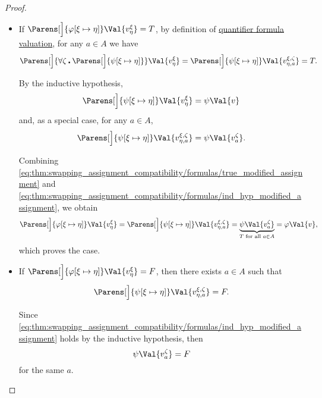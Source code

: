 \begin{proof}
\begin{itemize}
\begin{itemize}
      \begin{itemize}
        \item If \( \Parens[\Big]{\varphi[\xi \mapsto \eta]}\Val{v_\eta^\xi} = T \), by definition of \hyperref[def:first_order_valuation/formula_valuation]{quantifier formula valuation}, for any \( a \in A \) we have
        \begin{equation}\label{eq:thm:swapping_assignment_compatibility/formulas/true_modified_assignment}
          \Parens[\Big]{\forall \zeta \centerdot \Parens[\Big]{ \psi[\xi \mapsto \eta] }}\Val{v_\eta^\xi}
          =
          \Parens[\Big]{\psi[\xi \mapsto \eta]}\Val{v_{\eta,a}^{\xi,\zeta}}
          =
          T.
        \end{equation}

        By the inductive hypothesis,
        \begin{equation*}
          \Parens[\Big]{ \psi[\xi \mapsto \eta] }\Val{v_\eta^\xi} = \psi\Val{v}
        \end{equation*}
        and, as a special case, for any \( a \in A \),
        \begin{equation}\label{eq:thm:swapping_assignment_compatibility/formulas/ind_hyp_modified_assignment}
          \Parens[\Big]{ \psi[\xi \mapsto \eta] }\Val{v_{\eta,a}^{\xi,\zeta}} = \psi\Val{v_a^\zeta}.
        \end{equation}

        Combining \eqref{eq:thm:swapping_assignment_compatibility/formulas/true_modified_assignment} and \eqref{eq:thm:swapping_assignment_compatibility/formulas/ind_hyp_modified_assignment}, we obtain
        \begin{equation*}
          \Parens[\Big]{ \varphi[\xi \mapsto \eta] }\Val{v_\eta^\xi}
          =
          \Parens[\Big]{ \psi[\xi \mapsto \eta] }\Val{v_{\eta,a}^{\xi,\zeta}}
          =
          \underbrace{\psi\Val{v_a^\zeta}}_{T \T{for all} a \in A}
          =
          \varphi\Val{v},
        \end{equation*}
        which proves the case.

        \item If \( \Parens[\Big]{\varphi[\xi \mapsto \eta]}\Val{v_\eta^\xi} = F \), then there exists \( a \in A \) such that
        \begin{equation*}
          \Parens[\Big]{\psi[\xi \mapsto \eta]}\Val{v_{\eta,a}^{\xi,\zeta}} = F.
        \end{equation*}

        Since \eqref{eq:thm:swapping_assignment_compatibility/formulas/ind_hyp_modified_assignment} holds by the inductive hypothesis, then
        \begin{equation*}
          \psi\Val{v_a^\zeta} = F
        \end{equation*}
        for the same \( a \).


\end{itemize}
\end{itemize}
\end{itemize}
\end{proof}
